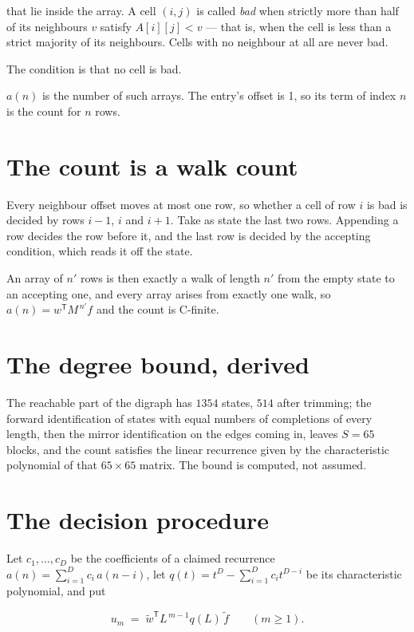 \documentclass[11pt]{article}
\theoremstyle{definition}
\begin{document}
that lie inside the array. A cell $(i,j)$ is called {\itshape bad} when strictly more than half of its neighbours $v$ satisfy $A[i][j] < v$ --- that is, when the cell is less than a strict majority of its neighbours. Cells with no neighbour at all are never bad.

The condition is that no cell is bad.

$a(n)$ is the number of such arrays. The entry's offset is 1, so its term of index $n$ is the count for $n$ rows.

\section{The count is a walk count}

Every neighbour offset moves at most one row, so whether a cell of row $i$ is bad is decided by rows $i-1$, $i$ and $i+1$. Take as state the last two rows. Appending a row decides the row before it, and the last row is decided by the accepting condition, which reads it off the state.

An array of $n'$ rows is then exactly a walk of length $n'$ from the empty state to an accepting one, and every array arises from exactly one walk, so $a(n) = w^{\mathsf T}M^{\,n'}f$ and the count is C-finite.

\section{The degree bound, derived}

The reachable part of the digraph has $1354$ states, $514$ after trimming; the forward identification of states with equal numbers of completions of every length, then the mirror identification on the edges coming in, leaves $S = 65$ blocks, and the count satisfies the linear recurrence given by the characteristic polynomial of that $65\times65$ matrix. The bound is computed, not assumed.

\section{The decision procedure}

Let $c_1,\dots,c_D$ be the coefficients of a claimed recurrence $a(n) = \sum_{i=1}^{D} c_i\,a(n-i)$, let $q(t) = t^{D} - \sum_{i=1}^{D} c_i t^{D-i}$ be its characteristic polynomial, and put

\[u_m \;=\; \tilde w^{\mathsf T} L^{\,m-1} q(L)\,\tilde f \qquad (m \ge 1).\]
\end{document}
